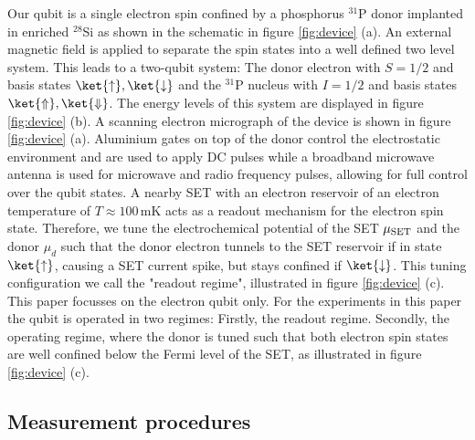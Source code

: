 Our qubit is a single electron spin confined by a phosphorus $^{31}$P donor implanted in enriched $^{28}$Si as shown in the schematic in figure \ref{fig:device} (a). An external magnetic field is applied to separate the spin states into a well defined two level system. This leads to a two-qubit system: The donor electron with $S=1/2$ and basis states $\ket{\uparrow},\ket{\downarrow}$ and the $^{31}$P nucleus with $I=1/2$ and basis states $\ket{\Uparrow},\ket{\Downarrow}$. The energy levels of this system are displayed in figure \ref{fig:device} (b). A scanning electron micrograph of the device is shown in figure \ref{fig:device} (a).  Aluminium gates on top of the donor control the electrostatic environment and are used to apply DC pulses while a broadband microwave antenna is used for microwave and radio frequency pulses, allowing for full control over the qubit states. A nearby SET with an electron reservoir of an electron temperature of $T\approx 100\,$mK acts as a readout mechanism for the electron spin state. Therefore, we tune the electrochemical potential of the SET $\mu_{\rm SET}$ and the donor $\mu_d$ such that the donor electron tunnels to the SET reservoir if in state $\ket{\uparrow}$, causing a SET current spike, but stays confined if $\ket{\downarrow}$. This tuning configuration we call the "readout regime", illustrated in figure \ref{fig:device} (c). 
This paper focusses on the electron qubit only. For the experiments in this paper the qubit is operated in two regimes: Firstly, the readout regime. Secondly, the operating regime, where the donor is tuned such that both electron spin states are well confined below the Fermi level of the SET, as illustrated in figure \ref{fig:device} (c). 


\subsection{\label{sec:Measurementprocedures} Measurement procedures}

